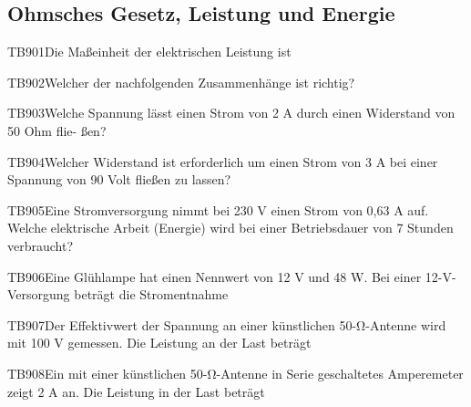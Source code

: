 \subsection{Ohmsches Gesetz, Leistung und Energie}

\begin{question}{TB901}{Die Maßeinheit der elektrischen Leistung ist}
\end{question}

\begin{question}{TB902}{Welcher der nachfolgenden Zusammenhänge ist richtig?}
\end{question}

\begin{question}{TB903}{Welche Spannung lässt einen Strom von 2 A durch einen Widerstand von 50 Ohm flie- ßen?}
\end{question}

\begin{question}{TB904}{Welcher Widerstand ist erforderlich um einen Strom von 3 A bei einer Spannung von 90 Volt fließen zu lassen?}
\end{question}

\begin{question}{TB905}{Eine Stromversorgung nimmt bei 230 V einen Strom von 0,63 A auf. Welche elektrische Arbeit (Energie) wird bei einer Betriebsdauer von 7 Stunden verbraucht?}
\end{question}

\begin{question}{TB906}{Eine Glühlampe hat einen Nennwert von 12 V und 48 W. Bei einer 12-V-Versorgung beträgt die Stromentnahme}
\end{question}

\begin{question}{TB907}{Der Effektivwert der Spannung an einer künstlichen 50-Ω-Antenne wird mit 100 V gemessen. Die Leistung an der Last beträgt}
\end{question}

\begin{question}{TB908}{Ein mit einer künstlichen 50-Ω-Antenne in Serie geschaltetes Amperemeter zeigt 2 A an. Die Leistung in der Last beträgt}
\end{question}


